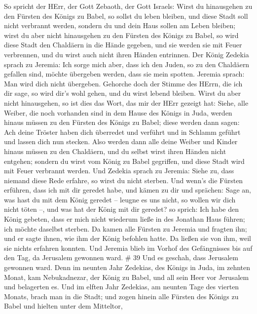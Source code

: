 So spricht der HErr, der Gott Zebaoth, der Gott Israels: Wirst du
hinausgehen zu den Fürsten des Königs zu Babel, so sollst du leben
bleiben, und diese Stadt soll nicht verbrannt werden, sondern du und
dein Haus sollen am Leben bleiben;  wirst du aber nicht
hinausgehen zu den Fürsten des Königs zu Babel, so wird diese Stadt den
Chaldäern in die Hände gegeben, und sie werden sie mit Feuer verbrennen,
und du wirst auch nicht ihren Händen entrinnen.  Der König
Zedekia sprach zu Jeremia: Ich sorge mich aber, dass ich den Juden, so
zu den Chaldäern gefallen sind, möchte übergeben werden, dass sie mein
spotten.  Jeremia sprach: Man wird dich nicht übergeben.
Gehorche doch der Stimme des HErrn, die ich dir sage, so wird dir's wohl
gehen, und du wirst lebend bleiben.  Wirst du aber nicht
hinausgehen, so ist dies das Wort, das mir der HErr gezeigt hat:
 Siehe, alle Weiber, die noch vorhanden sind in dem Hause
des Königs in Juda, werden hinaus müssen zu den Fürsten des Königs zu
Babel; diese werden dann sagen: Ach deine Tröster haben dich überredet
und verführt und in Schlamm geführt und lassen dich nun stecken.
 Also werden dann alle deine Weiber und Kinder hinaus
müssen zu den Chaldäern, und du selbst wirst ihren Händen nicht
entgehen; sondern du wirst vom König zu Babel gegriffen, und diese Stadt
wird mit Feuer verbrannt werden.  Und Zedekia sprach zu
Jeremia: Siehe zu, dass niemand diese Rede erfahre, so wirst du nicht
sterben.  Und wenn's die Fürsten erführen, dass ich mit dir
geredet habe, und kämen zu dir und sprächen: Sage an, was hast du mit
dem König geredet -- leugne es uns nicht, so wollen wir dich nicht töten
--, und was hat der König mit dir geredet?  so sprich: Ich
habe den König gebeten, dass er mich nicht wiederum ließe in des
Jonathan Haus führen; ich möchte daselbst sterben.  Da
kamen alle Fürsten zu Jeremia und fragten ihn; und er sagte ihnen, wie
ihm der König befohlen hatte. Da ließen sie von ihm, weil sie nichts
erfahren konnten.  Und Jeremia blieb im Vorhof des
Gefängnisses bis auf den Tag, da Jerusalem gewonnen ward. \# 39
 Und es geschah, dass Jerusalem gewonnen ward. Denn im
neunten Jahr Zedekias, des Königs in Juda, im zehnten Monat, kam
Nebukadnezar, der König zu Babel, und all sein Heer vor Jerusalem und
belagerten es.  Und im elften Jahr Zedekias, am neunten Tage
des vierten Monats, brach man in die Stadt;  und zogen
hinein alle Fürsten des Königs zu Babel und hielten unter dem Mitteltor,
